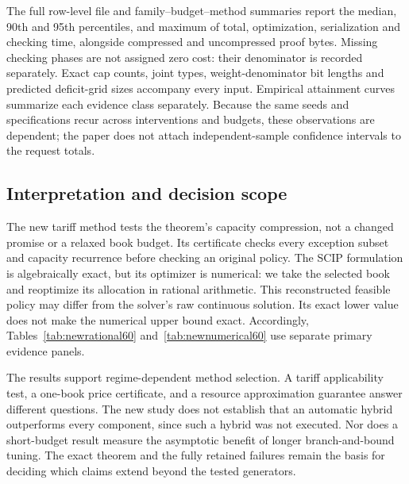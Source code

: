 

The full row-level file and family--budget--method summaries report the median, 90th and 95th percentiles, and maximum of total, optimization, serialization and checking time, alongside compressed and uncompressed proof bytes. Missing checking phases are not assigned zero cost: their denominator is recorded separately. Exact cap counts, joint types, weight-denominator bit lengths and predicted deficit-grid sizes accompany every input. Empirical attainment curves summarize each evidence class separately. Because the same seeds and specifications recur across interventions and budgets, these observations are dependent; the paper does not attach independent-sample confidence intervals to the request totals.

\subsection{Interpretation and decision scope}
The new tariff method tests the theorem's capacity compression, not a changed promise or a relaxed book budget. Its certificate checks every exception subset and capacity recurrence before checking an original policy. The SCIP formulation is algebraically exact, but its optimizer is numerical: we take the selected book and reoptimize its allocation in rational arithmetic. This reconstructed feasible policy may differ from the solver's raw continuous solution. Its exact lower value does not make the numerical upper bound exact. Accordingly, Tables~\ref{tab:newrational60} and~\ref{tab:newnumerical60} use separate primary evidence panels.

The results support regime-dependent method selection. A tariff applicability test, a one-book price certificate, and a resource approximation guarantee answer different questions. The new study does not establish that an automatic hybrid outperforms every component, since such a hybrid was not executed. Nor does a short-budget result measure the asymptotic benefit of longer branch-and-bound tuning. The exact theorem and the fully retained failures remain the basis for deciding which claims extend beyond the tested generators.

